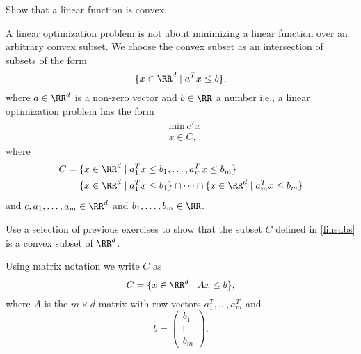 \documentclass{article}
\begin{document}
  \beginshex
  Show that a linear function is convex.
  \endshex
  
  A linear optimization problem is not about minimizing a linear function over
  an arbitrary convex subset. We choose the convex subset as an intersection of
  subsets of the form
  $$
  \{x\in \RR^d\mid a^T x \leq b\},
  $$
  where $a\in \RR^d$ is a non-zero vector and $b\in \RR$ a number i.e.,
  a linear optimization problem has the form
  \begin{align*}
    &\text{min}\,c^T x\\
    &x\in C,
  \end{align*}
  where
  \begin{align}\label{linsubs}
    C &= \{x\in \RR^d \mid a_1^T x \leq b_1, \dots, a_m^T x\leq b_m\}\\
    &= \{x\in \RR^d \mid a_1^T x \leq b_1\} \cap \cdots \cap \{x\in \RR^d \mid a_m^T x \leq b_m\}
  \end{align}
  and $c, a_1, \dots, a_m\in \RR^d$ and $b_1, \dots, b_m\in \RR$.

  \beginshex
  Use a selection of previous exercises to show that
  the subset $C$ defined in \eqref{linsubs} is a convex subset of $\RR^d$.
  \endshex
  
  Using matrix notation we write $C$ as
  $$
  C = \{x\in \RR^d \mid A x \leq b\},
  $$
  where $A$ is the $m\times d$ matrix with row vectors $a_1^T, \dots, a_m^T$ and
  $$
  b =
  \begin{pmatrix}
    b_1 \\ \vdots \\ b_m
  \end{pmatrix}.
  $$
\end{document}
